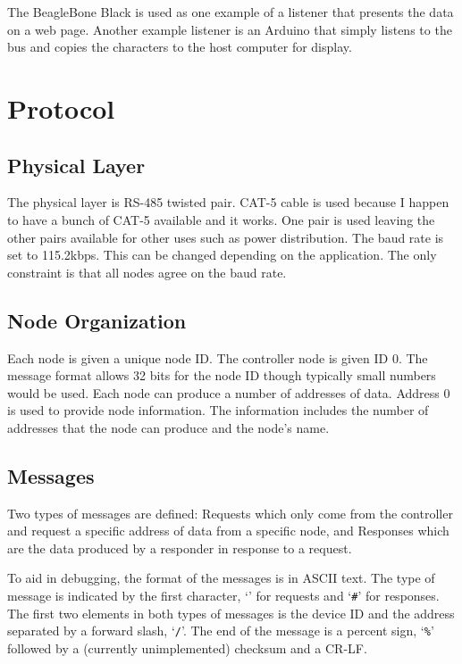 \documentclass[10pt, openany, draft]{article}
\begin{document}
The BeagleBone Black is used as one example of a listener that presents the data on a web page.  Another example listener is an Arduino that simply listens to the bus and copies the characters to the host computer for display.

\section{Protocol}
\subsection{Physical Layer}
The physical layer is RS-485 twisted pair.  CAT-5 cable is used because I happen to have a bunch of CAT-5 available and it works.  One pair is used leaving the other pairs available for other uses such as power distribution.  The baud rate is set to 115.2kbps.  This can be changed depending on the application.  The only constraint is that all nodes agree on the baud rate.

\subsection{Node Organization}
Each node is given a unique node ID.  The controller node is given ID 0.  The message format allows 32 bits for the node ID though typically small numbers would be used.  Each node can produce a number of addresses of data.  Address 0 is used to provide node information.  The information includes the number of addresses that the node can produce and the node's name.

\subsection{Messages}
Two types of messages are defined: Requests which only come from the controller and request a specific address of data from a specific node, and Responses which are the data produced by a responder in response to a request.

To aid in debugging, the format of the messages is in ASCII text.  The type of message is indicated by the first character, `\texttt{\@}' for requests and `\texttt{\#}' for responses.  The first two elements in both types of messages is the device ID and the address separated by a forward slash, `\texttt{/}'.  The end of the message is a percent sign, `\texttt{\%}' followed by a (currently unimplemented) checksum and a CR-LF.
\end{document}
